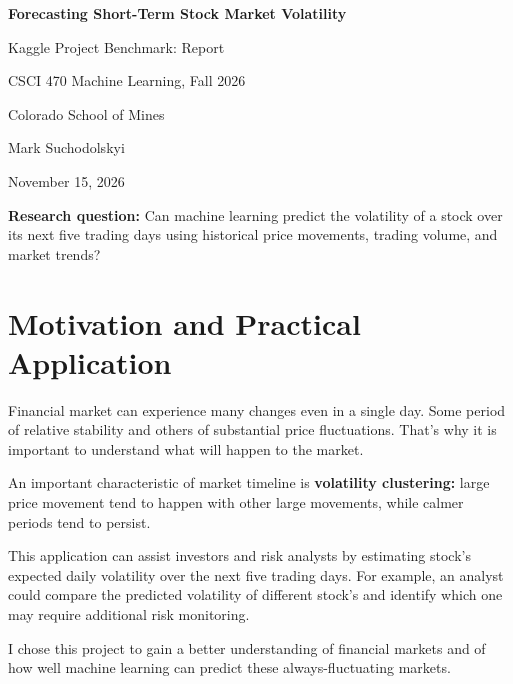 \documentclass[11pt]{article}
\begin{document}
\begin{titlepage}
\centering
\vspace*{3cm}
{\LARGE\bfseries Forecasting Short-Term Stock Market Volatility\par}
\vspace{1cm}
{\large Kaggle Project Benchmark: Report\par}
\vspace{0.5cm}
{\large CSCI 470 Machine Learning, Fall 2026\par}
{\large Colorado School of Mines\par}
\vspace{1.5cm}
{\large Mark Suchodolskyi\par}
\vspace{0.5cm}
{\large November 15, 2026\par}
\vspace{2cm}
\begin{minipage}{0.8\textwidth}
\textbf{Research question:} Can machine learning predict the volatility of a stock over its next five trading days using historical price movements, trading volume, and market trends?
\end{minipage}
\end{titlepage}

\section{Motivation and Practical Application}

Financial market can experience many changes even in a single day. Some period of relative stability and others of substantial price fluctuations. That's why it is important to understand what will happen to the market.

An important characteristic of market timeline is \textbf{volatility clustering:} large price movement tend to happen with other large movements, while calmer periods tend to persist.

This application can assist investors and risk analysts by estimating stock's expected daily volatility over the next five trading days. For example, an analyst could compare the predicted volatility of different stock's and identify which one may require additional risk monitoring.

I chose this project to gain a better understanding of financial markets and of how well machine learning can predict these always-fluctuating markets.
\end{document}
